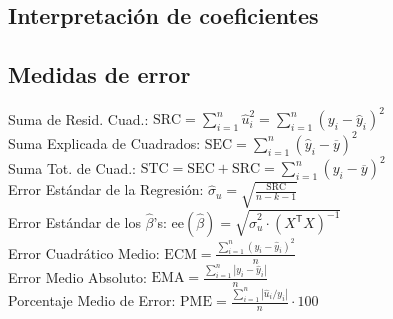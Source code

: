 \documentclass[10pt, a4paper, landscape]{extarticle}
\newcommand{\ee}{\mathrm{ee}}
\newcommand{\SRC}{\mathrm{SRC}}
\newcommand{\SEC}{\mathrm{SEC}}
\newcommand{\STC}{\mathrm{STC}}
\newcommand{\tr}{\mathsf{T}}
\begin{document}
\begin{multicols}{3}
	\subsection*{Interpretación de coeficientes}
		\begin{center}
		\end{center}
	\subsection*{Medidas de error}
		Suma de Resid. Cuad.: \hfill $\SRC = \sum_{i=1}^n \hat{u}_i^2 = \sum_{i=1}^n (y_i - \hat{y}_i)^2$ \\
		Suma Explicada de Cuadrados: \hfill $\SEC = \sum_{i=1}^n (\hat{y}_i - \overline{y})^2$ \\
		Suma Tot. de Cuad.: \hfill $\STC = \SEC + \SRC = \sum_{i=1}^n (y_i - \overline{y})^2$ \\
		Error Estándar de la Regresión: \hfill $\hat{\sigma}_u = \sqrt{\frac{\SRC}{n-k-1}}$ \\
		Error Estándar de los $\hat{\beta}$'s: \hfill $\ee(\hat{\beta}) = \sqrt{\hat{\sigma}^2_u \cdot (X^\tr X)^{-1}}$ \\
		Error Cuadrático Medio: \hfill $\mathrm{ECM} = \frac{\sum_{i=1}^n (y_i - \hat{y}_i)^2}{n}$ \\
		Error Medio Absoluto: \hfill $\mathrm{EMA} = \frac{\sum_{i=1}^n |y_i - \hat{y}_i|}{n}$ \\
		Porcentaje Medio de Error: \hfill $\mathrm{PME} = \frac{\sum_{i=1}^n |\hat{u}_i / y_i|}{n} \cdot 100$
\columnbreak

\end{multicols}
\end{document}
